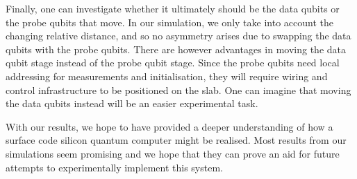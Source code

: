 Finally, one can investigate whether it ultimately should be the data qubits or the probe qubits that  move. In our simulation, we only take into account the changing relative distance, and so no asymmetry arises due to swapping the data qubits with the probe qubits. There are however advantages in moving the data qubit stage instead of the probe qubit stage. Since the probe qubits need local addressing for measurements and initialisation, they will require wiring and control infrastructure to be positioned on the slab. One can imagine that moving the data qubits instead will be an easier experimental task. 

With our results, we hope to have provided a deeper understanding of how a surface code silicon quantum computer might be realised. Most results from our simulations seem promising and we hope that they can prove an aid for future attempts to experimentally implement this system. 













